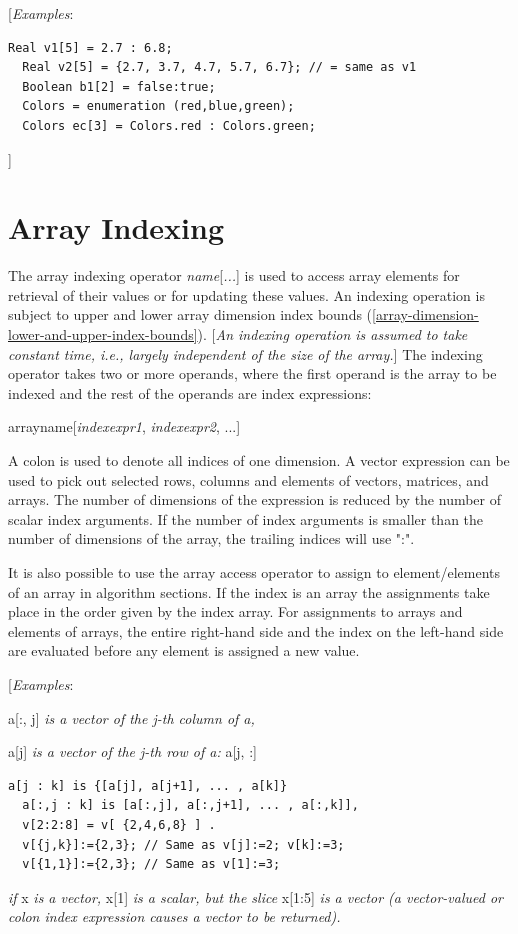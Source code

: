 \documentclass[10pt,a4paper]{report}
\def\doublelabel#1{\label{#1}\hypertarget{#1}{}}
\begin{document}
{[}\emph{Examples}:

\begin{lstlisting}[language=modelica]
  Real v1[5] = 2.7 : 6.8;
  Real v2[5] = {2.7, 3.7, 4.7, 5.7, 6.7}; // = same as v1
  Boolean b1[2] = false:true;
  Colors = enumeration (red,blue,green);
  Colors ec[3] = Colors.red : Colors.green;
\end{lstlisting}
{]}

\section{Array Indexing}\doublelabel{array-indexing}

The array indexing operator \emph{name}{[}\emph{...}{]} is used to
access array elements for retrieval of their values or for updating
these values. An indexing operation is subject to upper and lower array
dimension index bounds (\ref{array-dimension-lower-and-upper-index-bounds}). {[}\emph{An indexing operation
is assumed to take constant time, i.e., largely independent of the size
of the array.}{]} The indexing operator takes two or more operands,
where the first operand is the array to be indexed and the rest of the
operands are index expressions:

arrayname{[}\emph{indexexpr1}, \emph{indexexpr2}, ...{]}

A colon is used to denote all indices of one dimension. A vector
expression can be used to pick out selected rows, columns and elements
of vectors, matrices, and arrays. The number of dimensions of the
expression is reduced by the number of scalar index arguments. If the
number of index arguments is smaller than the number of dimensions of
the array, the trailing indices will use ":".

It is also possible to use the array access operator to assign to
element/elements of an array in algorithm sections. If the index is an
array the assignments take place in the order given by the index array.
For assignments to arrays and elements of arrays, the entire right-hand
side and the index on the left-hand side are evaluated before any
element is assigned a new value.

{[}\emph{Examples}:

a{[}:, j{]} \emph{is a vector of the j-th column of a,}

a{[}j{]} \emph{is a vector of the j-th row of a:} a{[}j, :{]}

\begin{lstlisting}[language=modelica]
  a[j : k] is {[a[j], a[j+1], ... , a[k]}
  a[:,j : k] is [a[:,j], a[:,j+1], ... , a[:,k]],
  v[2:2:8] = v[ {2,4,6,8} ] .
  v[{j,k}]:={2,3}; // Same as v[j]:=2; v[k]:=3;
  v[{1,1}]:={2,3}; // Same as v[1]:=3;
\end{lstlisting}
\emph{if} x \emph{is a vector,} x{[}1{]} \emph{is a scalar, but the
slice} x{[}1:5{]} \emph{is a vector (a vector-valued or colon index
expression causes a vector to be returned).}
\end{document}

